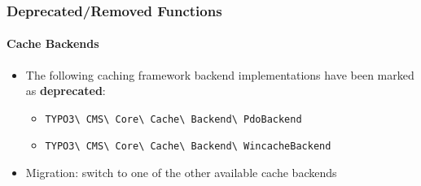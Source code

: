 %

\begin{frame}[fragile]
	\frametitle{Deprecated/Removed Functions}
	\framesubtitle{Cache Backends}


	\begin{itemize}
		\item The following caching framework backend implementations have been marked as \textbf{deprecated}:
			\begin{itemize}\small
				\item
					\texttt{TYPO3\textbackslash
						CMS\textbackslash
						Core\textbackslash
						Cache\textbackslash
						Backend\textbackslash
						PdoBackend}
				\item \texttt{TYPO3\textbackslash
						CMS\textbackslash
						Core\textbackslash
						Cache\textbackslash
						Backend\textbackslash
						WincacheBackend}
			\end{itemize}\normalsize
		\item Migration: switch to one of the other available cache backends
	\end{itemize}

\end{frame}

